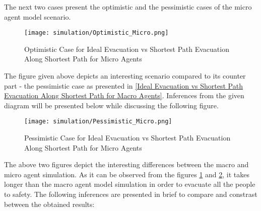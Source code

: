 The next two cases present the optimistic and the pessimistic cases of the micro agent model scenario.

\begin{figure}[H]
  \centering
  \texttt{[image: simulation/Optimistic\_Micro.png]}
  \caption{Optimistic Case for Ideal Evacuation vs Shortest Path Evacuation Along Shortest Path for Micro Agents}
  \label{Optimistic Case for Ideal Evacuation vs Shortest Path Evacuation Along Shortest Path for Micro Agents}
\end{figure}

The figure given above depicts an interesting scenario compared to its counter part - the pessimistic case as presented in \ref{Ideal Evacuation vs Shortest Path Evacuation Along Shortest Path for Macro Agents}. Inferences from the given diagram will be presented below while discussing the following figure.

\begin{figure}[H]
  \centering
  \texttt{[image: simulation/Pessimistic\_Micro.png]}
  \caption{Pessimistic Case for Ideal Evacuation vs Shortest Path Evacuation Along Shortest Path for Micro Agents}
  \label{Pessimistic Case for Ideal Evacuation vs Shortest Path Evacuation Along Shortest Path for Micro Agents}
\end{figure}


The above two figures depict the interesting differences between the macro and micro agent simulation. As it can be observed from the figures \ref{Optimistic Case for Ideal Evacuation vs Shortest Path Evacuation Along Shortest Path for Micro Agents} and \ref{Pessimistic Case for Ideal Evacuation vs Shortest Path Evacuation Along Shortest Path for Micro Agents}, it takes longer than the macro agent model simulation in order to evacuate all the people to safety. The following inferences are presented in brief to compare and constrast between the obtained results:


